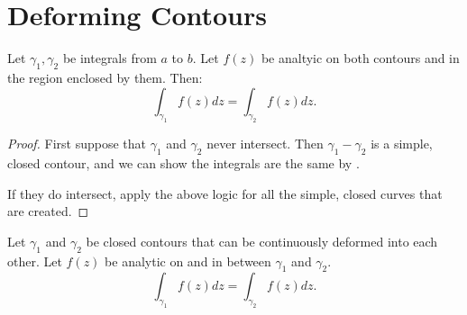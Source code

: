\documentclass[../Main.tex]{subfiles}
\begin{document}
\section{Deforming Contours}
\begin{proposition}
    Let $\gamma_1, \gamma_2$ be integrals from $a$ to $b$. Let $f(z)$ be analtyic on both contours and in the region enclosed by them. Then:
    \begin{equation*}
        \int_{\gamma_1}f(z) dz = \int_{\gamma_2} f(z) dz.
    \end{equation*}
    \label{propIntSameEndpoints}
\end{proposition}
\begin{proof}
    First suppose that $\gamma_1$ and $\gamma_2$ never intersect. Then $\gamma_1 - \gamma_2$ is a simple, closed contour, and we can show the integrals are the same by .

    If they do intersect, apply the above logic for all the simple, closed curves that are created.
\end{proof}
\begin{proposition}
    Let $\gamma_1$ and $\gamma_2$ be closed contours that can be continuously deformed into each other. Let $f(z)$ be analytic on and in between $\gamma_1$ and $\gamma_2$.
    \begin{equation*}
        \int_{\gamma_1} f(z) dz = \int_{\gamma_2} f(z) dz.
    \end{equation*}
    \label{propContourShrink}
\end{proposition}
\end{document}
